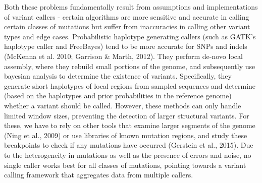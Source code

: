 \documentclass{article}
\begin{document}
Both these problems fundamentally result from assumptions and implementations of variant callers - certain algorithms are more sensitive and accurate in calling certain classes of mutations but suffer from inaccuracies in calling other variant types and edge cases. Probabilistic haplotype generating callers (such as GATK's haplotype caller and FreeBayes) tend to be more accurate for SNPs and indels (McKenna et al. 2010; Garrison \& Marth, 2012). They perform de-novo local assembly, where they rebuild small portions of the genome, and subsequently use bayesian analysis to determine the existence of variants. Specifically, they generate short haplotypes of local regions from sampled sequences and determine (based on the haplotypes and prior probabilities in the reference genome) whether a variant should be called. However, these methods can only handle limited window sizes, preventing the detection of larger structural variants. For these, we have to rely on other tools that examine larger segments of the genome (Ning et al., 2009) or use libraries of known mutation regions, and study these breakpoints to check if any mutations have occurred (Gerstein et al., 2015). Due to the heterogeneity in mutations as well as the presence of errors and noise, no single caller works best for all classes of mutations, pointing towards a variant calling framework that aggregates data from multiple callers.\\
\end{document}

